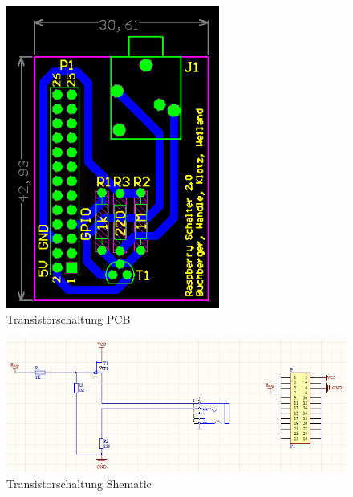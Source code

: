 \begin{figure}[H]
\centering
\includegraphics[keepaspectratio=true, width=7cm]{images/rpi/Transistorschaltung_PCB.png}
\caption{Transistorschaltung PCB}
\label{fig:report_hardware_TransPCB}
\end{figure}
\begin{figure}[H]
\centering
\includegraphics[keepaspectratio=true, width=17cm]{images/rpi/Transistorschaltung_Schematic.png}
\caption{Transistorschaltung Shematic}
\label{fig:report_hardware_TransSche}
\end{figure}
